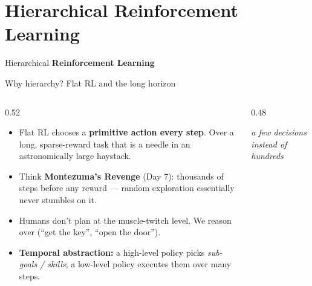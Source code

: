 \section{Hierarchical Reinforcement Learning}

\begin{frame}{}
    \LARGE Hierarchical \textbf{Reinforcement Learning}
\end{frame}

\begin{frame}{Why hierarchy? Flat RL and the long horizon}
\begin{columns}[c]
\begin{column}{0.52\textwidth}
\begin{itemize}\footnotesize\itemsep0.5em
    \item Flat RL chooses a \textbf{primitive action every step}. Over a long,
          sparse-reward task that is a needle in an astronomically large haystack.
    \item Think \textbf{Montezuma's Revenge} (Day 7): thousands of steps before any
          reward --- random exploration essentially never stumbles on it.
    \item Humans don't plan at the muscle-twitch level. We reason over 
          (``get the key'', ``open the door'').
    \item \textbf{Temporal abstraction:} a high-level policy picks \emph{sub-goals /
          skills}; a low-level policy executes them over many steps.
\end{itemize}
\end{column}
\begin{column}{0.48\textwidth}
\centering
{}
\vspace{0.5em}

{\footnotesize\itshape a few decisions instead of hundreds}
\end{column}
\end{columns}
\end{frame}

